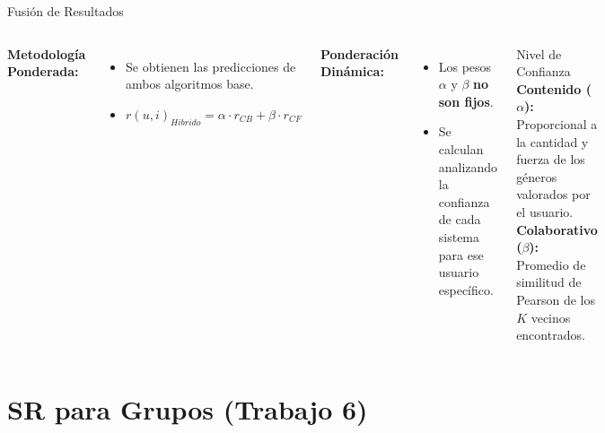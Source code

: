 \documentclass[aspectratio=169]{beamer}
\begin{document}
\begin{frame}{Fusión de Resultados}
  \begin{columns}[T]
      \textbf{Metodología Ponderada:}
      \begin{itemize}
        \item Se obtienen las predicciones de ambos algoritmos base.
        \item $r(u,i)_{Hibrido} = \alpha \cdot r_{CB} + \beta \cdot r_{CF}$
      \end{itemize}
      
      \vspace{0.2cm}
      \textbf{Ponderación Dinámica:}
      \begin{itemize}
        \item Los pesos $\alpha$ y $\beta$ \textbf{no son fijos}.
        \item Se calculan analizando la confianza de cada sistema para ese usuario específico.
      \end{itemize}

      \begin{block}{Nivel de Confianza}
        \textbf{Contenido ($\alpha$):}\\
        Proporcional a la cantidad y fuerza de los géneros valorados por el usuario.\\
        \vspace{0.1cm}
        \textbf{Colaborativo ($\beta$):}\\
        Promedio de similitud de Pearson de los $K$ vecinos encontrados.
      \end{block}
  \end{columns}
\end{frame}

\section{SR para Grupos (Trabajo 6)}
\end{document}
